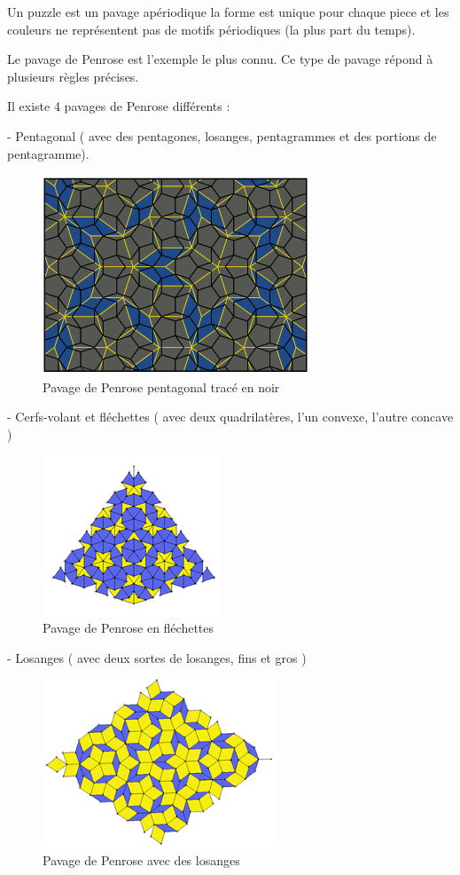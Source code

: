 \documentclass{article}
\begin{document}
Un puzzle est un pavage apériodique la forme est unique pour chaque piece et les couleurs ne représentent pas de motifs périodiques (la plus part du temps).


Le pavage de Penrose est l'exemple le plus connu.
Ce type de pavage répond à plusieurs règles précises.


Il existe 4 pavages de Penrose différents :


- Pentagonal ( avec des pentagones, losanges, pentagrammes et des portions de pentagramme).

\begin{figure} [h]
    \center
    \includegraphics [scale=0.5] {image/penrose_pentagone.png}
    \caption{Pavage de Penrose pentagonal tracé en noir}
\end{figure}

- Cerfs-volant et fléchettes ( avec deux quadrilatères, l'un convexe, l'autre concave )

\begin{figure} [h]
    \center
    \includegraphics [scale=0.5] {image/penrose_flechette.png}
    \caption{Pavage de Penrose en fléchettes}
\end{figure}

- Losanges ( avec deux sortes de losanges, fins et gros )

\begin{figure} [h]
    \center
    \includegraphics [scale=0.5] {image/penrose_losange.png}
    \caption{Pavage de Penrose avec des losanges}
\end{figure}
\end{document}
